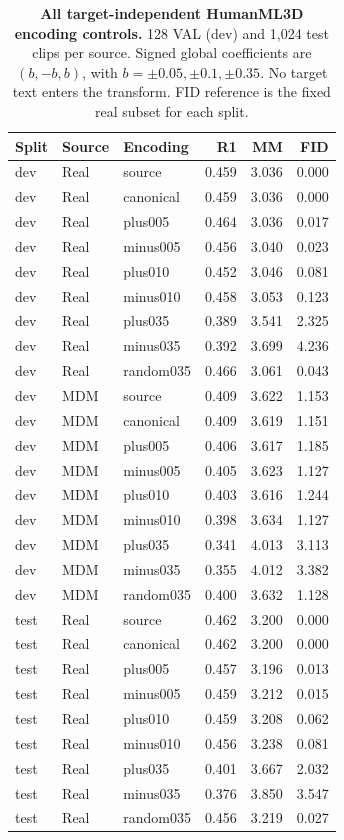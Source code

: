 \begin{table}[t]\centering\small
\caption{\textbf{All target-independent HumanML3D encoding controls.} 128 VAL (dev) and 1,024 test clips per source. Signed global coefficients are $(b,-b,b)$, with $b=\pm0.05,\pm0.1,\pm0.35$. No target text enters the transform. FID reference is the fixed real subset for each split.}
\label{tab:humanmlfixed}
\begin{tabular}{lllrrr}\toprule
Split&Source&Encoding&R1&MM&FID\\\midrule
dev&Real&source&0.459&3.036&0.000\\
dev&Real&canonical&0.459&3.036&0.000\\
dev&Real&plus005&0.464&3.036&0.017\\
dev&Real&minus005&0.456&3.040&0.023\\
dev&Real&plus010&0.452&3.046&0.081\\
dev&Real&minus010&0.458&3.053&0.123\\
dev&Real&plus035&0.389&3.541&2.325\\
dev&Real&minus035&0.392&3.699&4.236\\
dev&Real&random035&0.466&3.061&0.043\\
dev&MDM&source&0.409&3.622&1.153\\
dev&MDM&canonical&0.409&3.619&1.151\\
dev&MDM&plus005&0.406&3.617&1.185\\
dev&MDM&minus005&0.405&3.623&1.127\\
dev&MDM&plus010&0.403&3.616&1.244\\
dev&MDM&minus010&0.398&3.634&1.127\\
dev&MDM&plus035&0.341&4.013&3.113\\
dev&MDM&minus035&0.355&4.012&3.382\\
dev&MDM&random035&0.400&3.632&1.128\\
test&Real&source&0.462&3.200&0.000\\
test&Real&canonical&0.462&3.200&0.000\\
test&Real&plus005&0.457&3.196&0.013\\
test&Real&minus005&0.459&3.212&0.015\\
test&Real&plus010&0.459&3.208&0.062\\
test&Real&minus010&0.456&3.238&0.081\\
test&Real&plus035&0.401&3.667&2.032\\
test&Real&minus035&0.376&3.850&3.547\\
test&Real&random035&0.456&3.219&0.027\\

\end{tabular}
\end{table}

